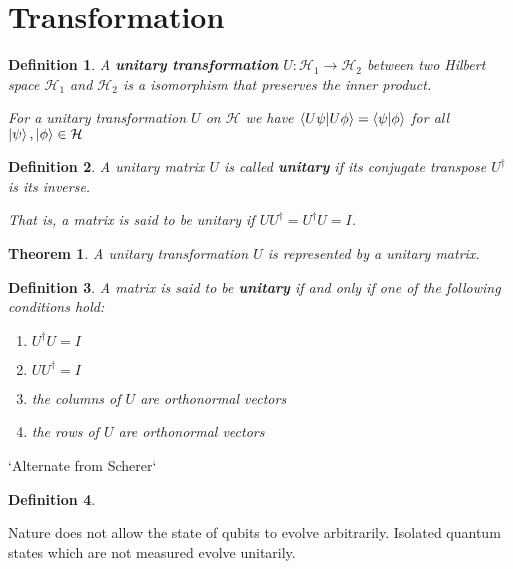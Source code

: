 \documentclass[12pt,twoside,fleqn]{report}
\makeatletter
\theoremstyle{thmstyle}
\renewenvironment{proof}[1][\proofname]{\par
\pushQED{\qed}%
\normalfont \topsep6\p@\@plus6\p@\relax
\trivlist
\item[\hskip\labelsep\itshape#1\@addpunct{.}]\mbox{}\par\nobreak\ignorespaces
}{%
    \popQED\endtrivlist\@endpefalse
    }
\newtheorem{defn}{Definition}[chapter]
\newtheorem{thm}{Theorem}[chapter]
\makeatother
\begin{document}
\section{Transformation}

\begin{defn}
    A \textbf{unitary transformation} $U: \mathcal{H}_1 \to \mathcal{H}_2$ between two Hilbert space $\mathcal{H}_1$ and $\mathcal{H}_2$ is a isomorphism that preserves the inner product.

    For a unitary transformation $U$ on $\mathcal{H}$ we have
    $\braket{U \psi | U \phi } = \braket{\psi | \phi }$ for all $\ket{\psi}, \ket{\phi} \in \mathcal{H}$

\end{defn}

\begin{defn}
    A unitary matrix $U$ is called \textbf{unitary} if its conjugate transpose $U^\dagger$ is its inverse.

    That is, a matrix is said to be unitary if $U U^\dagger = U^\dagger U = I$.
\end{defn}

\begin{thm}
A unitary transformation $U$ is represented by a unitary matrix.
\end{thm}
\begin{proof}
\end{proof}

\begin{defn}
    A matrix is said to be \textbf{unitary} if and only if one of the following conditions hold:
    \begin{enumerate}
        \item $U^\dagger U = I$
        \item $U U^\dagger = I$
        \item the columns of $U$ are orthonormal vectors
        \item the rows of $U$ are orthonormal vectors
    \end{enumerate}
\end{defn}

`Alternate from Scherer`
\begin{defn}
\end{defn}


Nature does not allow the state of qubits to evolve arbitrarily. Isolated quantum states which are not measured evolve unitarily.
\end{document}
